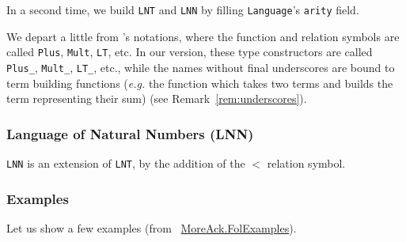 In a second time, we build \texttt{LNT} and \texttt{LNN} by filling \texttt{Language}'s \texttt{arity} field.


\begin{remark}
  We depart a little from \cite{Goedel}'s notations, where the 
function and relation symbols are called \texttt{Plus}, 
\texttt{Mult}, \texttt{LT}, etc. In our version, these type constructors are called \texttt{Plus\_}, 
\texttt{Mult\_}, \texttt{LT\_}, etc., while the names without final underscores are bound to term building functions (\emph{e.g.}
the function which takes two terms and builds the term representing their sum) (see Remark~\ref{rem:underscores}).
\end{remark}


\subsubsection{Language of Natural Numbers (LNN)}

\texttt{LNN} is an extension of \texttt{LNT}, by the addition 
of the $<$ relation symbol.





\subsubsection{Examples}

Let us show a few examples (from ~\href{../theories/html/hydras.MoreAck.FolExamples.html}{MoreAck.FolExamples}).

 










